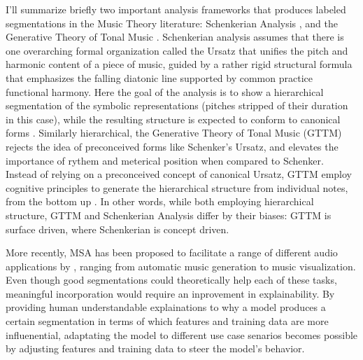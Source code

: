 I’ll summarize briefly two important analysis frameworks that produces labeled segmentations in the Music Theory literature: Schenkerian Analysis \citep{schenker2001free}, and the Generative Theory of Tonal Music \citep{lerdahl1983generative}.
Schenkerian analysis assumes that there is one overarching formal organization called the Ursatz that unifies the pitch and harmonic content of a piece of music, guided by a rather rigid structural formula that emphasizes the falling diatonic line supported by common practice functional harmony. 
Here the goal of the analysis is to show a hierarchical segmentation of the symbolic representations (pitches stripped of their duration in this case), while the resulting structure is expected to conform to canonical forms \citep{schenker2001free}. 
Similarly hierarchical, the Generative Theory of Tonal Music (GTTM) rejects the idea of preconceived forms like Schenker’s Ursatz, and elevates the importance of rythem and meterical position when compared to Schenker.
Instead of relying on a preconceived concept of canonical Ursatz, GTTM employ cognitive principles to generate the hierarchical structure from individual notes, from the bottom up \citep{lerdahl1983generative}.
In other words, while both employing hierarchical structure, GTTM and Schenkerian Analysis differ by their biases: GTTM is surface driven, where Schenkerian is concept driven.

More recently, MSA has been proposed to facilitate a range of different audio applications by \cite{nieto2020structure}, ranging from automatic music generation to music visualization.
Even though good segmentations could theoretically help each of these tasks, meaningful incorporation would require an inprovement in explainability.
By providing human understandable explainations to why a model produces a certain segmentation in terms of which features and training data are more influenential, adaptating the model to different use case senarios becomes possible by adjusting features and training data to steer the model's behavior.

